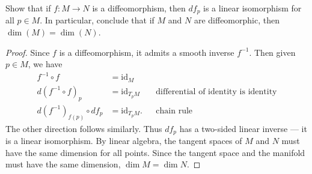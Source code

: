 \documentclass[12pt]{article}
\begin{document}
\begin{problem}[LN 5.10]
Show that if $ f: M \to N$ is a diffeomorphism, then $ df_p$ is a linear isomorphism for all $ p \in M$. In particular, conclude that if $ M$ and  $ N$ are diffeomorphic, then  $ \dim (M) = \dim (N)$.

\end{problem}
\begin{proof}
Since $ f$ is a diffeomorphism, it admits a smooth inverse  $ f^{-1}$. Then given $ p \in M$, we have
\begin{align*}
	f^{-1} \circ f &= \text{id}_{M} \\
	d(f^{-1} \circ f)_p &= \text{id}_{T_pM} && \text{differential of identity is identity}  \\
	d(f^{-1})_{f(p)} \circ df_p &= \text{id}_{T_pM}. && \text{chain rule} 
\end{align*}
The other direction follows similarly. Thus $ df_p$ has a two-sided linear inverse --- it is a linear isomorphism. By linear algebra, the tangent spaces of $ M$ and  $ N$ must have the same dimension for all points. Since the tangent space and the manifold must have the same dimension,  $ \dim M = \dim N$.
\end{proof}
\end{document}
